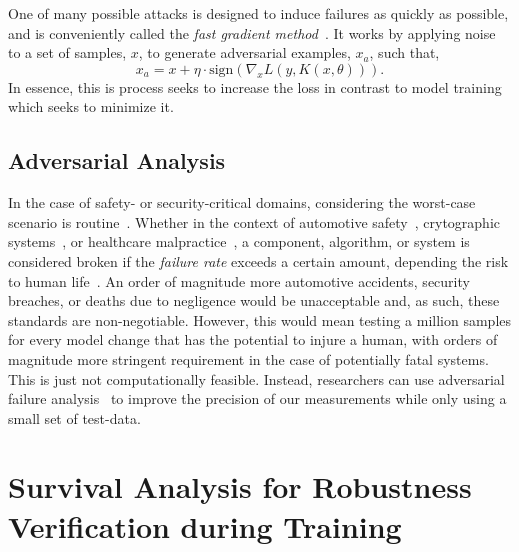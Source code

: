 \documentclass[journal]{IEEEtran}
\begin{document}
One of many possible attacks is designed to induce failures as quickly as possible, and is  conveniently called the \textit{fast gradient method}~\cite{fgm}. It works by applying noise to a set of samples, $x$, to generate adversarial examples, $x_a$, such that,
\begin{equation}
x_a = x + \eta \cdot \mathrm{sign}(\nabla_x L(y, K(x, \theta))).
\label{eq:fgm}
\end{equation}
In essence, this is process seeks to increase the loss  in contrast to model training which seeks to minimize it.


\subsection{Adversarial Analysis}

In the case of safety- or security-critical domains, considering the worst-case scenario is routine~\cite{sajid2013cloud}. Whether in the context of automotive safety~\cite{ai_automotive}, crytographic systems~\cite{leurent2020sha,kamal2017study}, or healthcare malpractice~\cite{ai_medical_imaging}, a component, algorithm, or system is considered broken if the \textit{failure rate} exceeds a certain amount, depending the risk to human life~\cite{iso26262}. An order of magnitude more automotive accidents, security breaches, or deaths due to negligence would be unacceptable and, as such, these standards are non-negotiable. However, this would mean testing a million samples for every model change that has the potential to injure a human, with orders of magnitude more stringent requirement in the case of potentially fatal systems. This is just not computationally feasible. Instead, researchers can use adversarial failure analysis~\cite{carlini_towards_2017,biggio_evasion_2013,meyers} to improve the precision of our measurements while only using a small set of test-data.





\section{Survival Analysis for Robustness Verification during Training}
\label{afr}
\end{document}
